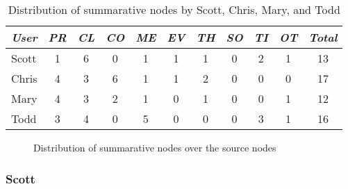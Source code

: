 \small
\begin{table}[hbtp]
\caption{Distribution of summarative nodes by Scott, Chris, Mary, and Todd}
\begin{center}
\begin{tabular} {||l|c|c|c|c|c|c|c|c|c||c||} \hline
{\em User} & {\em PR} & {\em CL} & {\em CO} & {\em ME} & {\em EV} & {\em
TH} & {\em SO} & {\em TI} & {\em OT} & {\em Total} \\ \hline \hline
Scott & 1 & 6 & 0 & 1 & 1 & 1 & 0 & 2 & 1 & 13 \\ \hline
Chris & 4 & 3 & 6 & 1 & 1 & 2 & 0 & 0 & 0 & 17 \\ \hline
Mary  & 4 & 3 & 2 & 1 & 0 & 1 & 0 & 0 & 1 & 12 \\ \hline
Todd  & 3 & 4 & 0 & 5 & 0 & 0 & 0 & 3 & 1 & 16 \\ \hline
 \hline
\end{tabular}  
\end{center}
\label{tab:case-summarization}
\end{table}
\normalsize
{}

\begin{figure}[hbtp]
  \caption{Distribution of summarative nodes over the source nodes}
  \label{fig:case-source-dist}
\end{figure}


\subsubsection{Scott}

